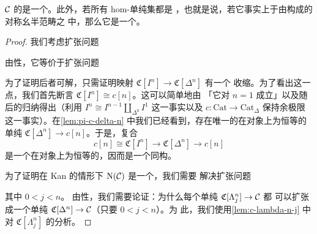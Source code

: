 \begin{lemma}\label{lem:coherent-nerve-composer}
\trSimplicialCategory{} $\mathcal{C}$ 的\trCoherentNerve{}是一个\trComposer{}。此外，若所有 hom-单纯集都是%
\trKanComplex{}，也就是说，若它事实上\trEnrichment{}于由\trKanComplex{}构成的对称幺半范畴之
中，那么它是一个\trInfinityCategory{}。
\end{lemma}

\begin{proof}
我们考虑扩张问题
\begin{center}
\end{center}
由\trAdjunction{}性，它等价于扩张问题
\begin{center}
\end{center}
为了证明后者可解，只需证明映射 $\mathfrak{C}[I^n] \to \mathfrak{C}[\Delta^n]$ 有一个
收缩。为了看出这一点，我们首先断言 $\mathfrak{C}[I^n] \cong c[n]$。这可以简单地由
「它对 $n = 1$ 成立」以及随后的归纳得出（利用 $I^n \cong I^{n-1} \amalg_{\Delta^0} I^1$
这一事实以及\trFunctor{} $c\colon \mathrm{Cat} \to \mathrm{Cat}_{\Delta}$ 保持余极限这一事实）。在\cref{lem:pi-c-delta-n} 中我们已经看到，存在唯一的在对象上为恒等的单纯\trFunctor{}%
$\mathfrak{C}[\Delta^n] \to c[n]$。于是，复合
\[
c[n] \cong \mathfrak{C}[I^n] \to \mathfrak{C}[\Delta^n] \to c[n]
\]
是一个在对象上为恒等的\trFunctor{}，因而是一个同构。

为了证明在 Kan \trEnrichment{}的情形下 $\mathrm{N}(\mathcal{C})$ 是一个\trInfinityCategory{}，我们需要
解决扩张问题
\begin{center}
\end{center}
其中 $0 < j < n$。
由\trAdjunction{}性，我们需要论证：为什么每个单纯\trEnrichment{}\trFunctor{} $\mathfrak{C}[\Lambda^n_j] \to \mathcal{C}$ 都
可以扩张成一个单纯\trEnrichment{}\trFunctor{} $\mathfrak{C}[\Delta^n] \to \mathcal{C}$（只要 $0 < j < n$）。为
此，我们使用\cref{lem:c-lambda-n-j} 中对 $\mathfrak{C}[\Lambda^n_j]$ 的分析。


\end{proof}
